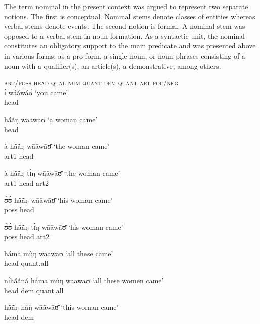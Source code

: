 \begin{exe}
\begin{exe}
\begin{exe}
{\begin{exe}
\begin{exe}
\begin{exe}
\begin{exe}
\begin{exe}
\begin{exe}
\begin{exe}
\begin{exe}
\begin{exe}
\begin{exe}
\begin{exe}
\begin{exe}
\begin{exe}
\begin{exe}
\begin{exe}
\begin{exe}
\begin{exe}
\begin{exe}
\begin{exe}
The term nominal in the present context was argued to represent two separate
notions. The first is  conceptual. Nominal stems denote classes of entities
whereas verbal stems denote events. The second notion is  formal. A nominal stem
was opposed to  a verbal stem in noun formation.  As a syntactic unit,  the
nominal  constitutes an obligatory support to the main predicate and was
presented above in  various forms:   as a pro-form, a single noun, or 
 noun phrases
consisting of a noun with a qualifier(s), an article(s), a demonstrative,  among
others.



\ea\label{ex:GRM-np-list} {\small 
\textsc{art/poss} \;  \textsc{head}\;   \textsc{qual}\;  \textsc{num}  
\;  
 \textsc{quant} \;    \textsc{dem} \;   \textsc{quant} \;   \textsc{art} \;  
\textsc{foc/neg} }\\


  \ea\label{ex:GRM-pro} 
ɪ̀   wááwáʊ́ {\rm `you came'}\\ {\sc head} 

  \ex\label{ex:GRM-h} 
hã́ã́ŋ wāāwāʊ̄ {\rm  `a woman came'}\\ 
{\sc head} 

  \ex\label{ex:GRM-ah} 
à hã́ã́ŋ  wāāwāʊ̄ {\rm  `the woman came'}\\  
{\sc art1} {\sc head} 

  \ex\label{ex:GRM-aha}
  à hã́ã́ŋ tɪ̀ŋ wāāwāʊ̄  {\rm  `the woman came'}\\  
{\sc art1} {\sc head} {\sc art2}

  \ex\label{ex:GRM-ph} 
ʊ̀ʊ̀ hã́ã́ŋ   wāāwāʊ̄  {\rm  `his woman came'}\\ 
 {\sc poss}  {\sc head}

  \ex\label{ex:GRM-pha} 
ʊ̀ʊ̀  hã́ã́ŋ tɪ̀ŋ   wāāwāʊ̄  {\rm  `his woman came'}\\
 {\sc poss} {\sc head} {\sc art2}  

 \ex\label{ex:GRM-dhq}
hámā mùŋ  wāāwāʊ̄ {\rm   `all these  came'}\\  
{\sc head} {\sc quant}{\rm .all}

 \ex\label{ex:GRM-hdq}
 nɪ̀hã́ã́ná hámā mùŋ  wāāwāʊ̄ {\rm  `all these women  came'}\\ 
  {\sc head} {\sc dem} {\sc quant}{\rm .all} 

  \ex\label{ex:GRM-hd} 
hã́ã́ŋ háŋ̀    wāāwāʊ̄ {\rm  `this woman  came'}\\ 
  {\sc head} {\sc dem}  


\end{exe}
\end{exe}
\end{exe}
\end{exe}
\end{exe}
\end{exe}
\end{exe}
\end{exe}
\end{exe}
\end{exe}
\end{exe}
\end{exe}
\end{exe}
\end{exe}
\end{exe}
\end{exe}
\end{exe}
\end{exe}
\end{exe}}
\end{exe}
\end{exe}
\end{exe}
